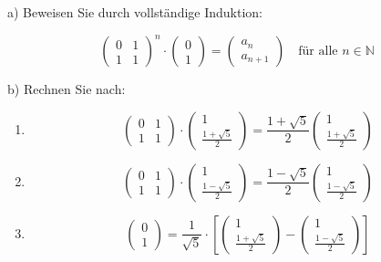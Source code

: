 \documentclass{beamer}
\begin{document}
\begin{frame}
\begin{enumerate}
    \begin{small}
    \item a) Beweisen Sie durch vollständige Induktion:
    \end{small}
    \[
    \begin{pmatrix} 0 & 1 \\ 1 & 1 \end{pmatrix}^n \cdot \begin{pmatrix} 0 \\ 1 \end{pmatrix} = \begin{pmatrix} a_n \\ a_{n+1} \end{pmatrix} \quad \text{für alle } n \in \mathbb{N}
    \]
    \begin{small}
    \item[b)] Rechnen Sie nach:
    \end{small}
    \begin{enumerate}[i]  
    \item
    \[\begin{pmatrix} 0 & 1 \\ 1 & 1 \end{pmatrix} \cdot \begin{pmatrix} 1 \\ \frac{1 + \sqrt{5}}{2} \end{pmatrix} = \frac{1 + \sqrt{5}}{2} \begin{pmatrix} 1 \\ \frac{1 + \sqrt{5}}{2} \end{pmatrix}
    \]
    
    \item\[
    \begin{pmatrix} 0 & 1 \\ 1 & 1 \end{pmatrix} \cdot \begin{pmatrix} 1 \\ \frac{1 - \sqrt{5}}{2}  \end{pmatrix} = \frac{1 - \sqrt{5}}{2} \begin{pmatrix} 1 \\ \frac{1 - \sqrt{5}}{2} \end{pmatrix}
    \]
    \item
    \[
     \begin{pmatrix} 0 \\ 1 \end{pmatrix} = \frac{1}{\sqrt{5}} \cdot \left[ \begin{pmatrix} 1 \\ \frac{1 + \sqrt{5}}{2} \end{pmatrix} - \begin{pmatrix} 1 \\ \frac{1 - \sqrt{5}}{2} \end{pmatrix} \right]
    \]
    
\end{enumerate}
\end{enumerate}
\end{frame}
\end{document}
